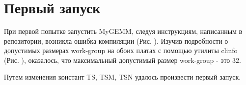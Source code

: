
\section{Первый запуск}

При первой попытке запустить MyGEMM, следуя инструкциям, написанным в репозитории, возникла ошибка компиляции (Рис. ). Изучив подробности о допустимых размерах work-group на обоих платах с помощью утилиты clinfo (Рис. ), оказалось, что максимальный допустимый размер work-group - это 32. 

Путем изменения констант TS, TSM, TSN удалось произвести первый запуск.